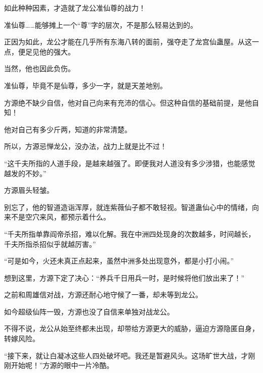 \begin{this_body}
如此种种因素，才造就了龙公准仙尊的战力！

准仙尊……能够摊上一个“尊”字的层次，不是那么轻易达到的。

正因为如此，龙公才能在几乎所有东海八转的面前，强夺走了龙宫仙蛊屋。从这一点，便足见他的强大。

当然，他也因此负伤。

准仙尊，毕竟不是仙尊，多少一字，就是天差地别。

方源绝不缺少自信，他对自己向来有充沛的信心。但这种自信的基础前提，是他自知！

他对自己有多少斤两，知道的非常清楚。

所以，方源忌惮龙公，没办法，战力上就是比不过！

“这千夫所指的人道手段，是越来越强了。即便我对人道没有多少涉猎，也能感觉越发的不妙。”

方源眉头轻皱。

别忘了，他的智道造诣浑厚，就连紫薇仙子都不敢轻视。智道蛊仙心中的情绪，向来不是空穴来风，都预示着什么。

“千夫所指单靠阎帝杀招，难以化解。我在中洲四处现身的次数越多，时间越长，千夫所指杀招似乎就越厉害。”

“可是如今，火还未真正点起来，虽然中洲多处出现意外，都是小打小闹。”

想到这里，方源下定了决心：“养兵千日用兵一时，是时候将他们放出来了！”

之前和周雄信对战，方源还耐心地守候了一番，却未等到龙公。

如今超级仙阵一毁，方源也没了自信来单独对战龙公。

不得不说，龙公从始至终都未出现，却带给方源更大的威胁，逼迫方源隐匿自身，转嫁风险。

“接下来，就让白凝冰这些人四处破坏吧。我还是暂避风头。这场旷世大战，才刚刚开始呢！”方源的眼中一片冷酷。

\end{this_body}


